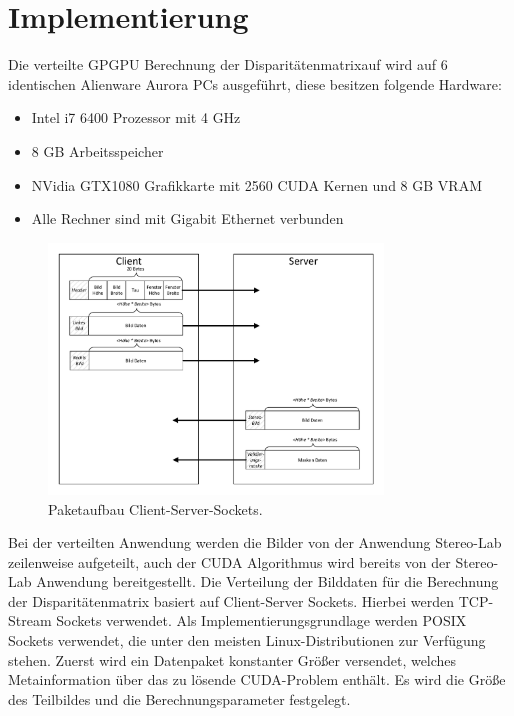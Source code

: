 \documentclass[conference]{IEEEtran}
\begin{document}
\section{Implementierung}
Die verteilte GPGPU Berechnung der Disparitätenmatrixauf wird auf 6 identischen Alienware Aurora PCs ausgeführt, diese besitzen folgende Hardware:
\begin{itemize}
\item Intel i7 6400 Prozessor mit 4 GHz
\item 8 GB Arbeitsspeicher
\item NVidia GTX1080 Grafikkarte mit 2560 CUDA Kernen und 8 GB VRAM
\item Alle Rechner sind mit Gigabit Ethernet verbunden
\end{itemize}


\begin{figure}[!t]
	\centering
	\includegraphics[width=3.5in]{Datenformat.pdf} %
	\caption{Paketaufbau Client-Server-Sockets.}
	\label{fig_client_server}
\end{figure}

Bei der verteilten Anwendung werden die Bilder von der Anwendung Stereo-Lab zeilenweise aufgeteilt, auch der CUDA Algorithmus wird bereits von der Stereo-Lab Anwendung bereitgestellt. 
Die Verteilung der Bilddaten für die Berechnung der Disparitätenmatrix basiert auf Client-Server Sockets. 
Hierbei werden TCP-Stream Sockets verwendet. Als Implementierungsgrundlage werden POSIX Sockets verwendet, die unter den meisten Linux-Distributionen zur Verfügung stehen. %
Zuerst wird ein Datenpaket konstanter Größer versendet, welches Metainformation über das zu lösende CUDA-Problem enthält. Es wird die Größe des Teilbildes und die Berechnungsparameter festgelegt. 
\end{document}
